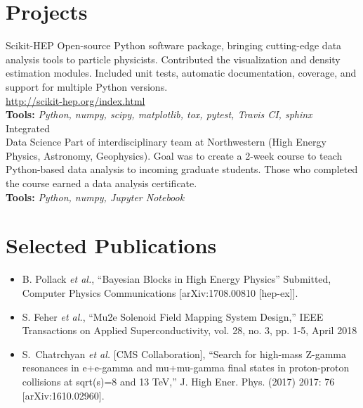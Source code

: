 \documentclass[letterpaper]{twentysecondcv} %
\begin{document}
\section{Projects}
\begin{twentyshort}
	\twentyitemshort
        {Scikit-HEP}
        {Open-source Python software package, bringing cutting-edge data analysis tools to particle physicists. Contributed the visualization and density estimation modules.  Included unit tests, automatic documentation, coverage, and support for multiple Python versions.\\
 \url{http://scikit-hep.org/index.html}\\
 \textbf{Tools:} \textit{Python, numpy, scipy, matplotlib, tox, pytest, Travis CI, sphinx}}\\
 
	\twentyitemshort
 	{Integrated \\Data Science}
 	{\vspace{-7mm} Part of interdisciplinary team at Northwestern (High Energy Physics, Astronomy, Geophysics).  Goal was to create a 2-week course
     to teach Python-based data analysis to incoming graduate students.  Those who completed the course earned
     a data analysis certificate.\\
 	 \textbf{Tools:} \textit{Python, numpy, Jupyter Notebook}}
               
\end{twentyshort}

\section{Selected Publications}
\begin{itemize}
     \item B. Pollack {\it et al.},
         ``Bayesian Blocks in High Energy Physics''
         Submitted, Computer Physics Communications
         [arXiv:1708.00810 [hep-ex]].

     \item S. Feher {\it et al.},
         ``Mu2e Solenoid Field Mapping System Design,''
         IEEE Transactions on Applied Superconductivity, vol. 28, no. 3, pp. 1-5, April 2018

     \item S.~Chatrchyan {\it et al.}  [CMS Collaboration],
         ``Search for high-mass Z-gamma resonances in e+e-gamma and mu+mu-gamma final states in
         proton-proton collisions at sqrt(s)=8 and 13 TeV,''
         J. High Ener. Phys. (2017) 2017: 76
         [arXiv:1610.02960].
 \end{itemize}
\end{document}

